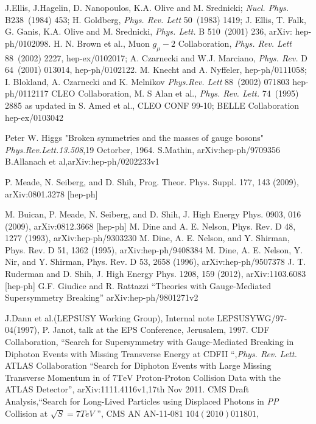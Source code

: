 \begin{thebibliography}{9}

J.Ellis, J.Hagelin, D. Nanopoulos, K.A. Olive and M. Srednicki; \emph{Nucl. Phys.} B238~(1984) 453; H. Goldberg, \emph{Phys. Rev. Lett} 50~(1983) 1419;
J. Ellis, T. Falk, G. Ganis, K.A. Olive and M. Srednicki, \emph{Phys. Lett.} B 510~(2001) 236, arXiv: hep-ph/0102098.
H. N. Brown et al., Muon $g_{\mu}-2$ Collaboration, \emph{Phys. Rev. Lett} 88~(2002) 2227, hep-ex/0102017; A. Czarnecki and W.J. Marciano,
\emph{ Phys. Rev.} D 64~(2001) 013014, hep-ph/0102122.
M. Knecht and A. Nyffeler, hep-ph/0111058; I. Blokland, A. Czarnecki and K. Melnikov \emph{Phys.Rev. Lett} 88~(2002) 071803 hep-ph/0112117
CLEO Collaboration, M. S Alan et al., \emph{Phys. Rev. Lett.} 74~(1995) 2885 as updated in S. Amed et al., CLEO CONF 99-10; 
 BELLE Collaboration hep-ex/0103042

 Peter W. Higgs "Broken symmetries and the masses of gauge bosons" \emph{Phys.Rev.Lett.13.508},19 Octorber, 1964.
S.Mathin, arXiv:hep-ph/9709356
B.Allanach et al,arXiv:hep-ph/0202233v1

P. Meade, N. Seiberg, and D. Shih, Prog. Theor. Phys.
Suppl. 177, 143 (2009), arXiv:0801.3278 [hep-ph]

M. Buican, P. Meade, N. Seiberg, and D. Shih, J. High Energy Phys. 0903, 016 (2009), arXiv:0812.3668 [hep-ph]
M. Dine and A. E. Nelson, Phys. Rev. D 48, 1277
(1993), arXiv:hep-ph/9303230
M. Dine, A. E. Nelson, and Y. Shirman, Phys. Rev. D
51, 1362 (1995), arXiv:hep-ph/9408384
M. Dine, A. E. Nelson, Y. Nir, and Y. Shirman, Phys.
Rev. D 53, 2658 (1996), arXiv:hep-ph/9507378
 J. T. Ruderman and D. Shih, J. High Energy Phys.
1208, 159 (2012), arXiv:1103.6083 [hep-ph]
G.F. Giudice and R. Rattazzi ``Theories with Gauge-Mediated Supersymmetry Breaking'' arXiv:hep-ph/9801271v2

J.Dann et al.(LEPSUSY Working Group), Internal note LEPSUSYWG/97-04(1997), P. Janot, talk at the EPS Conference, Jerusalem, 1997.
CDF Collaboration, ``Search for Supersymmetry with Gauge-Mediated Breaking in Diphoton Events with Missing Transverse Energy at CDFII ``,\emph{Phys. Rev. Lett.}
 ATLAS Collaboration ``Search for Diphoton Events with Large Missing Transverse Momentum in  of $\text{7TeV}$ Proton-Proton Collision Data with the ATLAS Detector'', arXiv:1111.4116v1,17th Nov 2011. 
CMS Draft Analysis,``Search for Long-Lived Particles using Displaced Photons in \emph{PP} Collision at $\sqrt{S}=7TeV$ '', CMS AN AN-11-081 \emph{$104(2010) 011801,$}


\end{thebibliography}
